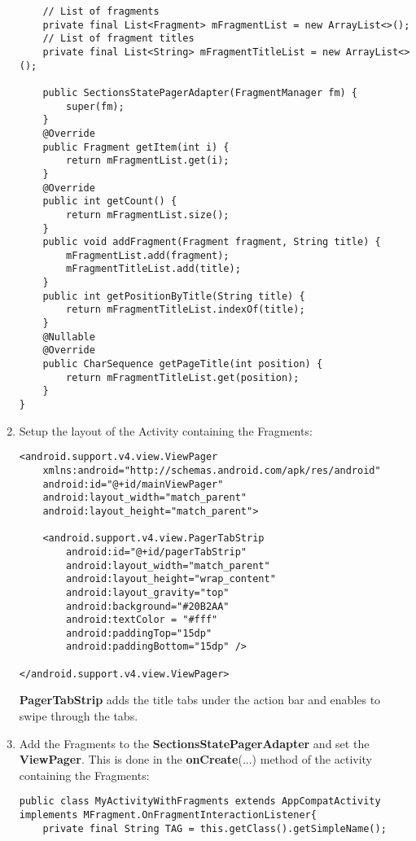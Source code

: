 \documentclass[11pt]{article}
\begin{document}
\begin{enumerate}
\begin{lstlisting}
    // List of fragments
    private final List<Fragment> mFragmentList = new ArrayList<>();
    // List of fragment titles
    private final List<String> mFragmentTitleList = new ArrayList<>();

    public SectionsStatePagerAdapter(FragmentManager fm) {
        super(fm);
    }
    @Override
    public Fragment getItem(int i) {
        return mFragmentList.get(i);
    }
    @Override
    public int getCount() {
        return mFragmentList.size();
    }
    public void addFragment(Fragment fragment, String title) {
        mFragmentList.add(fragment);
        mFragmentTitleList.add(title);
    }
    public int getPositionByTitle(String title) {
        return mFragmentTitleList.indexOf(title);
    }
    @Nullable
    @Override
    public CharSequence getPageTitle(int position) {
        return mFragmentTitleList.get(position);
    }
}
    \end{lstlisting}
    
    \item Setup the layout of the Activity containing the Fragments: 
    \lstset{language = XML}
    \begin{lstlisting}
<android.support.v4.view.ViewPager
    xmlns:android="http://schemas.android.com/apk/res/android"
    android:id="@+id/mainViewPager"
    android:layout_width="match_parent"
    android:layout_height="match_parent">
    
    <android.support.v4.view.PagerTabStrip
        android:id="@+id/pagerTabStrip"
        android:layout_width="match_parent"
        android:layout_height="wrap_content"
        android:layout_gravity="top"
        android:background="#20B2AA"
        android:textColor = "#fff"
        android:paddingTop="15dp"
        android:paddingBottom="15dp" />
        
</android.support.v4.view.ViewPager>
    \end{lstlisting}
    \textbf{PagerTabStrip} adds the title tabs under the action bar and enables to swipe through the tabs. 

    \item Add the Fragments to the \textbf{SectionsStatePagerAdapter} and set the \textbf{ViewPager}. This is done in the \textbf{onCreate}(...) method of the activity containing the Fragments: 
    \lstset{language = Java}
    \begin{lstlisting}
public class MyActivityWithFragments extends AppCompatActivity implements MFragment.OnFragmentInteractionListener{
    private final String TAG = this.getClass().getSimpleName();
    

\end{lstlisting}
\end{enumerate}
\end{document}
